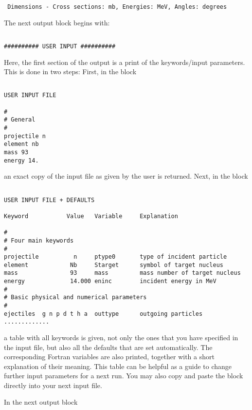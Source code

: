 \begin{samplecase}
{\begin{verbatim}
 Dimensions - Cross sections: mb, Energies: MeV, Angles: degrees
\end{verbatim} } \renewcommand{\baselinestretch}{1.07}\small\normalsize
\noindent
The next output block begins with:

{\small \begin{verbatim}

########## USER INPUT ##########
\end{verbatim} } \renewcommand{\baselinestretch}{1.07}\small\normalsize
\noindent
Here, the first section of the output is a print of the keywords/input 
parameters. This is done in two steps: First, in the block

{\small \begin{verbatim}

USER INPUT FILE
 
#
# General
#
projectile n
element nb
mass 93
energy 14.
\end{verbatim} } \renewcommand{\baselinestretch}{1.07}\small\normalsize
\noindent
an exact copy of the input file as given by the user is returned. Next, in
the block

{\small \begin{verbatim}

USER INPUT FILE + DEFAULTS
 
Keyword           Value   Variable     Explanation
 
#
# Four main keywords
#
projectile          n     ptype0       type of incident particle
element            Nb     Starget      symbol of target nucleus
mass               93     mass         mass number of target nucleus
energy             14.000 eninc        incident energy in MeV
#
# Basic physical and numerical parameters
#
ejectiles  g n p d t h a  outtype      outgoing particles      
.............
\end{verbatim} } \renewcommand{\baselinestretch}{1.07}\small\normalsize
\noindent
a table with all keywords is given, 
not only the ones that you have specified in the input file, but also all the 
defaults that are set automatically. The corresponding Fortran variables are 
also printed, together with a short explanation of their meaning. This table 
can be helpful as a guide to change further input parameters for a next run. 
You may also copy and paste the block directly into your next input file.

In the next output block

{\small \begin{verbatim}


\end{verbatim}}
\end{samplecase}
